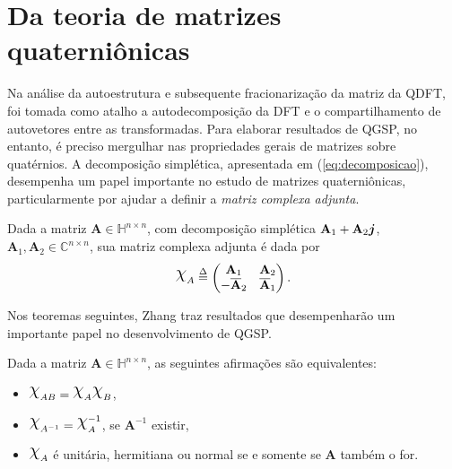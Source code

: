 \section{Da teoria de matrizes quaterni\^onicas}

Na an\'alise da autoestrutura e subsequente fracionariza\c c\~ao da matriz da QDFT, foi tomada como atalho a autodecomposi\c c\~ao da DFT e o compartilhamento de autovetores entre as transformadas. Para elaborar resultados de QGSP, no entanto, \'e preciso mergulhar nas propriedades gerais de matrizes sobre quat\'ernios. A decomposi\c c\~ao simpl\'etica, apresentada em (\ref{eq:decomposicao}), desempenha um papel importante no estudo de matrizes quaterni\^onicas, particularmente por ajudar a definir a \emph{matriz complexa adjunta}.

\begin{definition}
Dada a matriz $ \mathbf{A} \in \mathbb{H}^{n \times n} $, com decomposi\c c\~ao simpl\'etica $ \mathbf{A}_1 + \mathbf{A}_2 \boldsymbol{j}$, $ \mathbf{A}_1,\mathbf{A}_2 \in \mathbb{C}^{n \times n} $, sua matriz complexa adjunta \'e dada por
\begin{equation}
\rchi_{A} \overset{\Delta}{=}
\begin{pmatrix}
\mathbf{A}_1 & \mathbf{A}_2\\ 
- \overline{\mathbf{A}}_2 & \overline{\mathbf{A}}_1
\end{pmatrix}.
\end{equation}
\end{definition}

Nos teoremas seguintes, Zhang traz resultados que desempenhar\~ao um importante papel no desenvolvimento de QGSP.

\begin{theorem}
\label{th:equiv01}
Dada a matriz $ \mathbf{A} \in \mathbb{H}^{n \times n} $, as seguintes afirma\c c\~oes s\~ao equivalentes:

\begin{itemize}[noitemsep]
\item $ \rchi_{AB} = \rchi_{A} \rchi_{B} $,
\item $ \rchi_{A^{-1}} = \rchi_{A}^{-1}$, se $ \mathbf{A}^{-1} $ existir,
\item $ \rchi_{A}$ \'e unit\'aria, hermitiana ou normal se e somente se $ \mathbf{A} $ tamb\'em o for.
\end{itemize}

\end{theorem}

